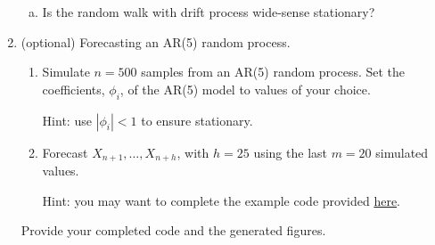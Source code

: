 \documentclass[12pt]{article}
\begin{document}
\begin{enumerate}
\begin{enumerate}[(a)]
            \item Is the random walk with drift process wide-sense stationary?

        \end{enumerate}
    \item (optional) Forecasting an AR(5) random process.

        \begin{enumerate}[a]

            \item Simulate $n=500$ samples from an AR(5) random process. Set
                the coefficients, $\phi_i$, of the AR(5) model to values of
                your choice.

                Hint: use $|\phi_i|<1$ to ensure stationary.

            \item Forecast $X_{n+1},\ldots,X_{n+h}$, with $h=25$ using the last
                $m=20$ simulated values.

                Hint: you may want to complete the example code provided
                \href{}{here}.

        \end{enumerate}

        Provide your completed code and the generated figures.


\end{enumerate}
\end{document}
